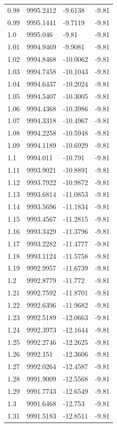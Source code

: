 \begin{table}[H]
\begin{tabular}{llll}
0.98 & 9995.2412 & -9.6138 & -9.81 \\
0.99 & 9995.1441 & -9.7119 & -9.81 \\
1.0 & 9995.046 & -9.81 & -9.81 \\
1.01 & 9994.9469 & -9.9081 & -9.81 \\
1.02 & 9994.8468 & -10.0062 & -9.81 \\
1.03 & 9994.7458 & -10.1043 & -9.81 \\
1.04 & 9994.6437 & -10.2024 & -9.81 \\
1.05 & 9994.5407 & -10.3005 & -9.81 \\
1.06 & 9994.4368 & -10.3986 & -9.81 \\
1.07 & 9994.3318 & -10.4967 & -9.81 \\
1.08 & 9994.2258 & -10.5948 & -9.81 \\
1.09 & 9994.1189 & -10.6929 & -9.81 \\
1.1 & 9994.011 & -10.791 & -9.81 \\
1.11 & 9993.9021 & -10.8891 & -9.81 \\
1.12 & 9993.7922 & -10.9872 & -9.81 \\
1.13 & 9993.6814 & -11.0853 & -9.81 \\
1.14 & 9993.5696 & -11.1834 & -9.81 \\
1.15 & 9993.4567 & -11.2815 & -9.81 \\
1.16 & 9993.3429 & -11.3796 & -9.81 \\
1.17 & 9993.2282 & -11.4777 & -9.81 \\
1.18 & 9993.1124 & -11.5758 & -9.81 \\
1.19 & 9992.9957 & -11.6739 & -9.81 \\
1.2 & 9992.8779 & -11.772 & -9.81 \\
1.21 & 9992.7592 & -11.8701 & -9.81 \\
1.22 & 9992.6396 & -11.9682 & -9.81 \\
1.23 & 9992.5189 & -12.0663 & -9.81 \\
1.24 & 9992.3973 & -12.1644 & -9.81 \\
1.25 & 9992.2746 & -12.2625 & -9.81 \\
1.26 & 9992.151 & -12.3606 & -9.81 \\
1.27 & 9992.0264 & -12.4587 & -9.81 \\
1.28 & 9991.9009 & -12.5568 & -9.81 \\
1.29 & 9991.7743 & -12.6549 & -9.81 \\
1.3 & 9991.6468 & -12.753 & -9.81 \\
1.31 & 9991.5183 & -12.8511 & -9.81 \\

\end{tabular}
\end{table}
